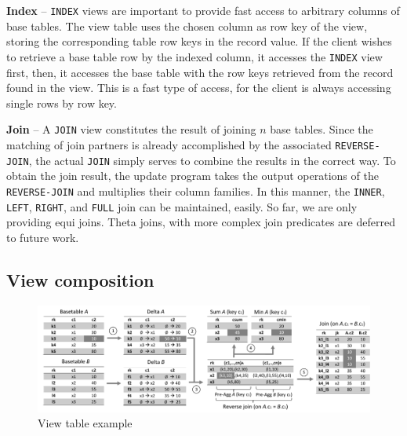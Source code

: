 \noindent
\textbf{Index} -- \texttt{INDEX} views are important to provide fast
access to arbitrary columns of base tables. The view table uses the
chosen column as row key of the view, storing the corresponding table
row keys in the record value. If the client wishes to retrieve a base
table row by the indexed column, it accesses the \texttt{INDEX} view
first, then, it accesses the base table with the row keys retrieved
from the record found in the view. This is a fast type of access, for
the client is always accessing single rows by row key. 

\noindent
\textbf{Join} -- A \texttt{JOIN} view constitutes the result of
joining $n$ base tables. Since the matching of join partners is
already accomplished by the associated \texttt{REVERSE-JOIN}, the
actual \texttt{JOIN} simply serves to combine the results in the
correct way.  To obtain the join result,
%
%
the update program takes the output operations of the
\texttt{REVERSE-JOIN} and multiplies their column families. In this
manner, the \texttt{INNER}, \texttt{LEFT}, \texttt{RIGHT}, and
\texttt{FULL} join can be maintained, easily. So far, we are only 
providing equi joins. Theta joins, with more complex join predicates
are deferred to future work.

\subsection{View composition}
\label{subsec:view_chain}

\begin{figure}
  \includegraphics[width=\linewidth]{figures/ViewCalculationExample}
  \caption{View table example}\label{fig:view_table_example}
\endminipage\hfill
\vspace{-2mm}  
\end{figure}

